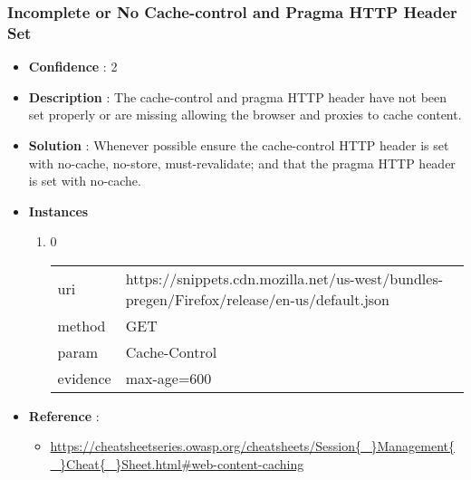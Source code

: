 \documentclass[10pt]{article}
\begin{document}
\subsubsection{Incomplete or No Cache-control and Pragma HTTP Header Set}
\begin{itemize}
\item[] \textbf{Confidence} : 2
\item[] \textbf{Description} : The cache-control and pragma HTTP header have not been set properly or are missing allowing the browser and proxies to cache content.
\item[] \textbf{Solution} :  Whenever possible ensure the cache-control HTTP header is set with no-cache, no-store, must-revalidate; and that the pragma HTTP header is set with no-cache.
\item[] \textbf{Instances}
\begin{enumerate}
\item[] 0
\begin{tabular}{| l | p{14cm}}
uri & https://snippets.cdn.mozilla.net/us-west/bundles-pregen/Firefox/release/en-us/default.json \\
method & GET \\
param & Cache-Control \\
evidence & max-age=600 \\
\end{tabular}
\end{enumerate}
\item[] \textbf{Reference} : 
\begin{itemize}
\item \url{https://cheatsheetseries.owasp.org/cheatsheets/Session{\_}Management{\_}Cheat{\_}Sheet.html\#web-content-caching}
\end{itemize}
\end{itemize}
\end{document}
